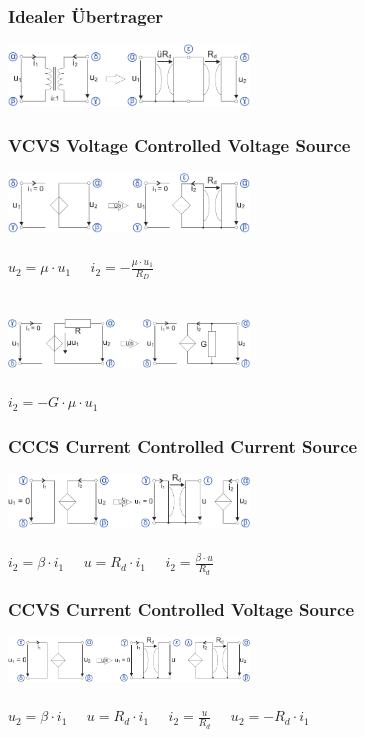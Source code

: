 \documentclass[a4paper,twocolumn,10pt]{article}
\begin{document}
\subsubsection*{Idealer Übertrager}
\includegraphics[width=0.48\textwidth]{Grafiken/KSA_Uebertrager}
\subsubsection*{VCVS Voltage Controlled Voltage Source}
\includegraphics[width=0.48\textwidth]{Grafiken/KSA_USU}\\\\
$u_2=\mu \cdot u_1\;\;\;\;\;i_2=-\frac{\mu \cdot u_1}{R_D}$\\\\\\
\includegraphics[width=0.48\textwidth]{Grafiken/KSA_USU2}\\\\
$i_2=-G\cdot \mu\cdot u_1$
\subsubsection*{CCCS Current Controlled Current Source}
\includegraphics[width=0.48\textwidth]{Grafiken/KSA_ISI}\\\\
$i_2=\beta \cdot i_1\;\;\;\;\;u=R_d\cdot i_1\;\;\;\;\;i_2=\frac{\beta \cdot u}{R_d}$
\subsubsection*{CCVS Current Controlled Voltage Source}
\includegraphics[width=0.48\textwidth]{Grafiken/KSA_ISU}\\\\
$u_2=\beta \cdot i_1\;\;\;\;\;u=R_d\cdot i_1\;\;\;\;\;i_2=\frac{u}{R_d}\;\;\;\;\;u_2=-R_d\cdot i_1$
\end{document}
